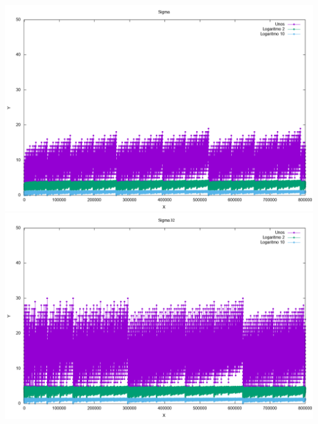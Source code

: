 \documentclass{article}
\begin{document}
		\includegraphics[width=\textwidth]{grafica}
		\includegraphics[width=\textwidth]{grafica32}
\end{document}
